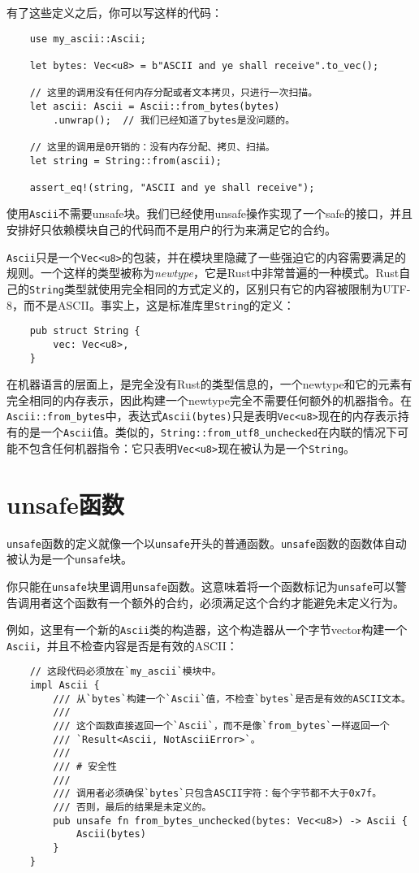 有了这些定义之后，你可以写这样的代码：
\begin{verbatim}
    use my_ascii::Ascii;

    let bytes: Vec<u8> = b"ASCII and ye shall receive".to_vec();

    // 这里的调用没有任何内存分配或者文本拷贝，只进行一次扫描。
    let ascii: Ascii = Ascii::from_bytes(bytes)
        .unwrap();  // 我们已经知道了bytes是没问题的。

    // 这里的调用是0开销的：没有内存分配、拷贝、扫描。
    let string = String::from(ascii);

    assert_eq!(string, "ASCII and ye shall receive");
\end{verbatim}

使用\texttt{Ascii}不需要unsafe块。我们已经使用unsafe操作实现了一个safe的接口，并且安排好只依赖模块自己的代码而不是用户的行为来满足它的合约。

\texttt{Ascii}只是一个\texttt{Vec<u8>}的包装，并在模块里隐藏了一些强迫它的内容需要满足的规则。一个这样的类型被称为\emph{newtype}，它是Rust中非常普遍的一种模式。Rust自己的\texttt{String}类型就使用完全相同的方式定义的，区别只有它的内容被限制为UTF-8，而不是ASCII。事实上，这是标准库里\texttt{String}的定义：
\begin{verbatim}
    pub struct String {
        vec: Vec<u8>,
    }
\end{verbatim}

在机器语言的层面上，是完全没有Rust的类型信息的，一个newtype和它的元素有完全相同的内存表示，因此构建一个newtype完全不需要任何额外的机器指令。在\texttt{Ascii::from\_bytes}中，表达式\texttt{Ascii(bytes)}只是表明\texttt{Vec<u8>}现在的内存表示持有的是一个\texttt{Ascii}值。类似的，\texttt{String::from\_utf8\_unchecked}在内联的情况下可能不包含任何机器指令：它只表明\texttt{Vec<u8>}现在被认为是一个\texttt{String}。

\section{unsafe函数}
\texttt{unsafe}函数的定义就像一个以\texttt{unsafe}开头的普通函数。\texttt{unsafe}函数的函数体自动被认为是一个\texttt{unsafe}块。

你只能在\texttt{unsafe}块里调用\texttt{unsafe}函数。这意味着将一个函数标记为\texttt{unsafe}可以警告调用者这个函数有一个额外的合约，必须满足这个合约才能避免未定义行为。

例如，这里有一个新的\texttt{Ascii}类的构造器，这个构造器从一个字节vector构建一个\texttt{Ascii}，并且不检查内容是否是有效的ASCII：
\begin{verbatim}
    // 这段代码必须放在`my_ascii`模块中。
    impl Ascii {
        /// 从`bytes`构建一个`Ascii`值，不检查`bytes`是否是有效的ASCII文本。
        ///
        /// 这个函数直接返回一个`Ascii`，而不是像`from_bytes`一样返回一个
        /// `Result<Ascii, NotAsciiError>`。
        ///
        /// # 安全性
        ///
        /// 调用者必须确保`bytes`只包含ASCII字符：每个字节都不大于0x7f。
        /// 否则，最后的结果是未定义的。
        pub unsafe fn from_bytes_unchecked(bytes: Vec<u8>) -> Ascii {
            Ascii(bytes)
        }
    }
\end{verbatim}

